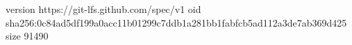 version https://git-lfs.github.com/spec/v1
oid sha256:0c84ad5df199a0acc11b01299c7ddb1a281bb1fabfcb5ad112a3de7ab369d425
size 91490

